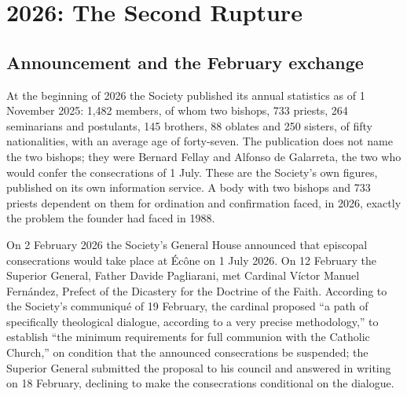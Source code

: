 \section{2026: The Second Rupture}

\subsection{Announcement and the February exchange}

At the beginning of 2026 the Society published its annual statistics as
of 1 November 2025: 1{,}482 members, of whom two bishops, 733 priests,
264 seminarians and postulants, 145 brothers, 88 oblates and 250 sisters,
of fifty nationalities, with an average age of forty-seven. The
publication does not name the two bishops; they were Bernard Fellay and
Alfonso de Galarreta, the two who would confer the consecrations of
1 July. These are the Society's own figures, published on its own
information service. A body with two bishops and 733 priests dependent on them for ordination
and confirmation faced, in 2026, exactly the problem the founder had
faced in 1988.

On 2 February 2026 the Society's General House announced that episcopal
consecrations would take place at Écône on 1 July 2026. On 12 February
the Superior General, Father Davide Pagliarani, met Cardinal Víctor
Manuel Fernández, Prefect of the Dicastery for the Doctrine of the Faith.
According to the Society's communiqué of 19 February, the cardinal
proposed ``a path of specifically theological dialogue, according to a
very precise methodology,'' to establish ``the minimum requirements for
full communion with the Catholic Church,'' on condition that the
announced consecrations be suspended; the Superior General submitted the
proposal to his council and answered in writing on 18 February, declining
to make the consecrations conditional on the dialogue.

